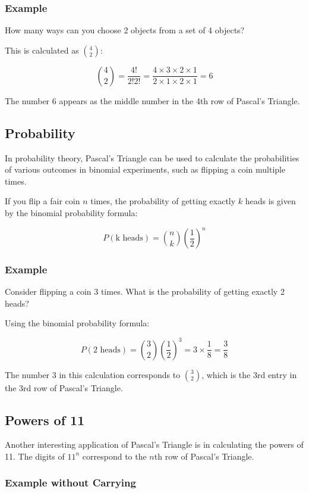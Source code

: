 \documentclass[12pt]{article}
\begin{document}
\subsubsection*{Example}

How many ways can you choose 2 objects from a set of 4 objects?

This is calculated as \(\binom{4}{2}\):

\[
\binom{4}{2} = \frac{4!}{2!2!} = \frac{4 \times 3 \times 2 \times 1}{2 \times 1 \times 2 \times 1} = 6
\]

The number \(6\) appears as the middle number in the 4th row of Pascal's Triangle.

\subsection*{Probability}

In probability theory, Pascal's Triangle can be used to calculate the probabilities of various outcomes in binomial experiments, such as flipping a coin multiple times.

If you flip a fair coin \(n\) times, the probability of getting exactly \(k\) heads is given by the binomial probability formula:

\[
P(\text{k heads}) = \binom{n}{k} \left(\frac{1}{2}\right)^n
\]

\subsubsection*{Example}

Consider flipping a coin 3 times. What is the probability of getting exactly 2 heads?

Using the binomial probability formula:

\[
P(\text{2 heads}) = \binom{3}{2} \left(\frac{1}{2}\right)^3 = 3 \times \frac{1}{8} = \frac{3}{8}
\]

The number \(3\) in this calculation corresponds to \(\binom{3}{2}\), which is the 3rd entry in the 3rd row of Pascal's Triangle.

\subsection*{Powers of 11}

Another interesting application of Pascal's Triangle is in calculating the powers of 11. The digits of \(11^n\) correspond to the \(n\)th row of Pascal's Triangle.

\subsubsection*{Example without Carrying}
\end{document}
